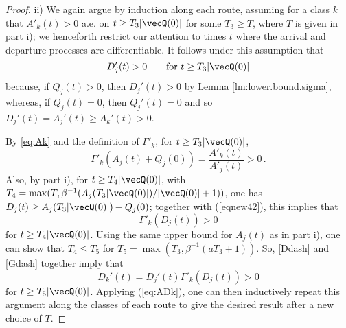 \documentclass{amsart}
\begin{document}
\begin{proof}
\iffalse
Seeking a contradiction, suppose $\lim_{t\rightarrow\infty} D_k(t)/t = 0$ and $\limsup_{t\rightarrow \infty} A_k(t)/t >0$ for some class $k$ at some queue $j$. 
Then $\limsup_{k\rightarrow\infty} Q_k(t)/t >0$, thus a positive proportion of the work in the network must be class $k$ work distributed along queue $j$. $Q_j(t)$ is greater than $Q_k(t)$. By the previous lemma and since $Q_j(t)$ is Lipschitz, $D\rq{}_j(t)$ must be bounded below for a positive proportion of time. Thus $\limsup_{t\rightarrow\infty} D_j(t)/t>0$. Further since service is FIFO and arrival rates to queue $j$ are bounded, over time positive proportions of class $k$ arrivals must depart. So one sees that $\limsup_{t\rightarrow\infty} D_k(t)/t>0$. This yields a contradiction. 

Clearly $\limsup_{t\rightarrow \infty} A_k(t)/t>0$ holds for each input class.  
The remainder of the proof applies the argument above by induction along the classes of each route.
\fi
\noindent ii) We again argue by induction along each route, assuming for a class $k$ that
$A'_k(t) > 0$ a.e. on $t\ge T_3|\vecQ(0)|$ for some $T_3\ge T$, where $T$ is given in part i); we henceforth restrict our attention to times $t$ where the arrival and departure processes are differentiable.  It follows under this assumption that 
\begin{equation}\label{Ddash}
D'_j(t)>0 \qquad \text{for } t\ge T_3|\vecQ(0)|
\end{equation}
because, if $Q_j(t) > 0$, then $D_j'(t)>0$ by Lemma \ref{lm:lower.bound.sigma}, whereas, if $Q_j(t)=0$, then $Q_j'(t)=0$ and so $D_j'(t)=A_j'(t)\geq A_k'(t)>0$. 

By \eqref{eq:Ak} and the definition of $\Gamma'_k$,  for $t\ge T_3|\vecQ(0)|$,
\begin{equation}
\label{eqnew42}
\Gamma'_k (A_j(t)+ Q_j(0)) = \frac{A'_k(t)}{A'_j(t)} > 0\,.
\end{equation} 
Also, by part i), for  $t \ge T_4 |\vecQ(0)|$, with $T_4 = \max(T , \beta^{-1} (A_j(T_3 |\vecQ(0)|)/|\vecQ(0)| +1))$, 
one has $D_j(t) \geq A_j(T_3 |\vecQ(0)|) + Q_j(0)$; together with (\ref{eqnew42}), this implies that 
\begin{equation}\label{Gdash}
\Gamma'_k(D_j(t))>0 
\end{equation}
for $t\geq T_4 |\vecQ(0)|$.
Using the same upper bound for $A_j(t)$ as in part i), one can show that $T_4 \le T_5$ for $T_5 = \max(T_3 , \beta^{-1}(\bar{a}T_3 + 1))$.
So, \eqref{Ddash} and \eqref{Gdash} together imply that 
\[
D_k'(t)= D_j'(t) \Gamma'_k(D_j(t))>0
\] 
for $t \ge T_5 |\vecQ(0)|$. Applying (\ref{eq:ADk}), one can then inductively repeat this argument along the classes of each route to give the desired result after a new choice of $T$.
\end{proof}
\end{document}
